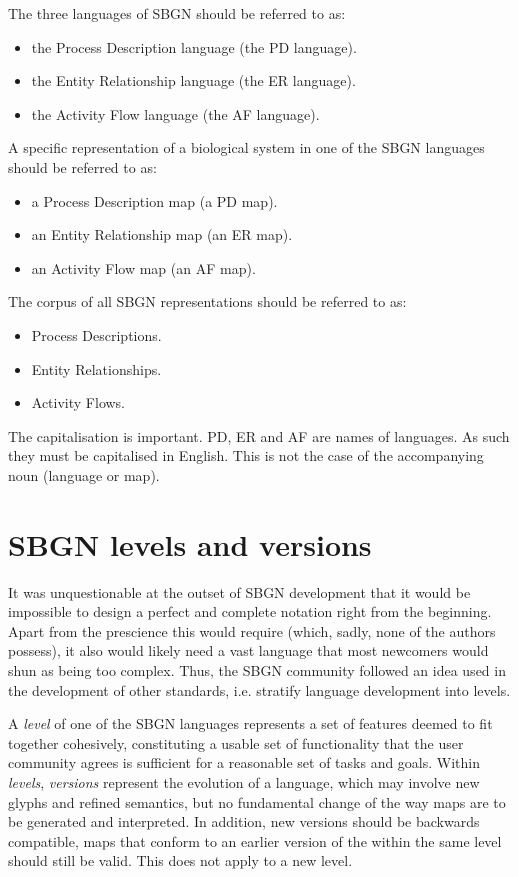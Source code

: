 The three languages of SBGN should be referred to as:
\begin{itemize}[noitemsep, nolistsep]
\item the Process Description language (the PD language).
\item the Entity Relationship language (the ER language).
\item the Activity Flow language (the AF language).
\end{itemize}

A specific representation of a biological system in one of the SBGN languages should be referred to as:
\begin{itemize}[noitemsep, nolistsep]
\item a Process Description map (a PD map).
\item an Entity Relationship map (an ER map).
\item an Activity Flow map (an AF map).
\end{itemize}

The corpus of all SBGN representations should be referred to as:
\begin{itemize}[noitemsep, nolistsep]
\item Process Descriptions.
\item Entity Relationships.
\item Activity Flows.
\end{itemize}

The capitalisation is important. PD, ER and AF are names of languages. As such they must be capitalised in English. This is not the case of the accompanying noun (language or map).

\section{SBGN levels and versions}
\label{sec:sbgn-levels}

It was unquestionable at the outset of SBGN development that it would be impossible to design a perfect and complete notation right from the beginning. Apart from the prescience this would require (which, sadly, none of the authors possess), it also would likely need a vast language that most newcomers would shun as being too complex. Thus, the SBGN community followed an idea used in the development of other standards, i.e. stratify language development into levels.

A \emph{level} of one of the SBGN languages represents a set of features deemed to fit together cohesively, constituting a usable set of functionality that the user community agrees is sufficient for a reasonable set of tasks and goals. Within \emph{levels}, \emph{versions} represent the evolution of a language, which may involve new glyphs and refined semantics, but no fundamental change of the way maps are to be generated and interpreted. In addition, new versions should be backwards compatible, \ie \AF maps that conform to an earlier version of the \AFl within the same level should still be valid. This does not apply to a new level.

